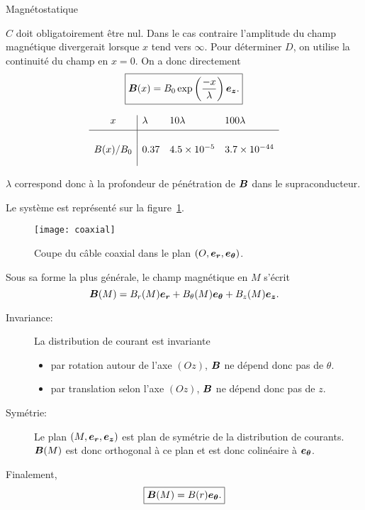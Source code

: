 \begin{corr}{Magnétostatique}
\begin{corrlist}
	\item $C$ doit obligatoirement être nul. Dans le cas contraire l'amplitude du
	      champ magnétique divergerait lorsque $x$ tend vers $\infty$. Pour déterminer $D$,
	      on utilise la continuité du champ en $x = 0$. On a donc directement
	      \begin{equation*}
		      \boxed{\vecb(x) = B_0 \exp\left(\dfrac{-x}{\lambda}\right)\ez.}
	      \end{equation*}
	
	\item
	\begin{equation*}
	     \begin{array}{c|lll}
			x	& \lambda & 10\lambda & 100\lambda \\[0.3em] \hline \\[0.2em]
			B(x)/B_0 & 0.37    & 4.5 \times 10^{-5} & 3.7 \times 10^{-44} \\[1em]
	      \end{array}
	\end{equation*}

	     $\lambda$ correspond donc à la profondeur de pénétration de $\vecb$
	     dans le supraconducteur.
\end{corrlist}


\begin{corrlist}
	\item Le système est représenté sur la figure~\ref{fig:magneto_coaxial}.
		\begin{figure}[h]
		\centering
		\texttt{[image: coaxial]}
		\caption{Coupe du câble coaxial dans le plan $(O, \er, \etheta)$.}
		\label{fig:magneto_coaxial}
	\end{figure}
	\item Sous sa forme la plus générale, le champ magnétique en $M$ 
	      s'écrit 
		      \begin{equation*}
			      \vecb(M) = B_r(M) \er + B_\theta(M) \etheta +
			      B_z(M) \ez.
		      \end{equation*}

		      \begin{description}
			     \item[Invariance:] La distribution de courant est 
			     invariante
			     \begin{itemize}
			     	\item par rotation autour de l'axe $(Oz)$, 
			     	      $\vecb$ ne dépend donc pas de $\theta$.
				\item par translation selon l'axe $(Oz)$, $\vecb$
				      ne dépend donc pas de $z$.
			     \end{itemize}
			      \item[Symétrie: ]
			      Le plan $(M, \er, \ez)$ est plan 
			      de symétrie de la distribution de 
			      courants. $\vecb(M)$ est donc 
			      orthogonal à ce plan et est donc colinéaire à
			      $\etheta$.
		      \end{description}
		     Finalement,
		     \begin{equation*}
			     \boxed{\vecb(M) = B(r) \etheta.}
		     \end{equation*}
	

\end{corrlist}
\end{corr}
